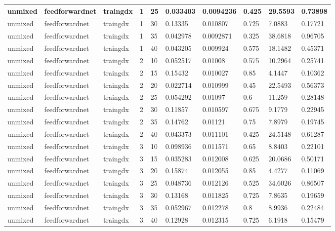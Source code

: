 \begin{longtable}{lllllllll}
unmixed & feedforwardnet & traingdx & 1 & 25 & 0.033403 & 0.0094236 & 0.425 & 29.5593 & 0.73898 \\ \hline 
unmixed & feedforwardnet & traingdx & 1 & 30 & 0.13335 & 0.010807 & 0.725 & 7.0883 & 0.17721 \\ \hline 
unmixed & feedforwardnet & traingdx & 1 & 35 & 0.042978 & 0.0092871 & 0.325 & 38.6818 & 0.96705 \\ \hline 
unmixed & feedforwardnet & traingdx & 1 & 40 & 0.043205 & 0.009924 & 0.575 & 18.1482 & 0.45371 \\ \hline 
unmixed & feedforwardnet & traingdx & 2 & 10 & 0.052517 & 0.01008 & 0.575 & 10.2964 & 0.25741 \\ \hline 
unmixed & feedforwardnet & traingdx & 2 & 15 & 0.15432 & 0.010027 & 0.85 & 4.1447 & 0.10362 \\ \hline 
unmixed & feedforwardnet & traingdx & 2 & 20 & 0.022714 & 0.010999 & 0.45 & 22.5493 & 0.56373 \\ \hline 
unmixed & feedforwardnet & traingdx & 2 & 25 & 0.054292 & 0.01097 & 0.6 & 11.259 & 0.28148 \\ \hline 
unmixed & feedforwardnet & traingdx & 2 & 30 & 0.11857 & 0.010597 & 0.675 & 9.1779 & 0.22945 \\ \hline 
unmixed & feedforwardnet & traingdx & 2 & 35 & 0.14762 & 0.01121 & 0.75 & 7.8979 & 0.19745 \\ \hline 
unmixed & feedforwardnet & traingdx & 2 & 40 & 0.043373 & 0.011101 & 0.425 & 24.5148 & 0.61287 \\ \hline 
unmixed & feedforwardnet & traingdx & 3 & 10 & 0.098936 & 0.011571 & 0.65 & 8.8403 & 0.22101 \\ \hline 
unmixed & feedforwardnet & traingdx & 3 & 15 & 0.035283 & 0.012008 & 0.625 & 20.0686 & 0.50171 \\ \hline 
unmixed & feedforwardnet & traingdx & 3 & 20 & 0.15874 & 0.012055 & 0.85 & 4.4277 & 0.11069 \\ \hline 
unmixed & feedforwardnet & traingdx & 3 & 25 & 0.048736 & 0.012126 & 0.525 & 34.6026 & 0.86507 \\ \hline 
unmixed & feedforwardnet & traingdx & 3 & 30 & 0.13168 & 0.011825 & 0.725 & 7.8635 & 0.19659 \\ \hline 
unmixed & feedforwardnet & traingdx & 3 & 35 & 0.052967 & 0.012278 & 0.8 & 8.9936 & 0.22484 \\ \hline 
unmixed & feedforwardnet & traingdx & 3 & 40 & 0.12928 & 0.012315 & 0.725 & 6.1918 & 0.15479 \\ \hline 

\end{longtable}
